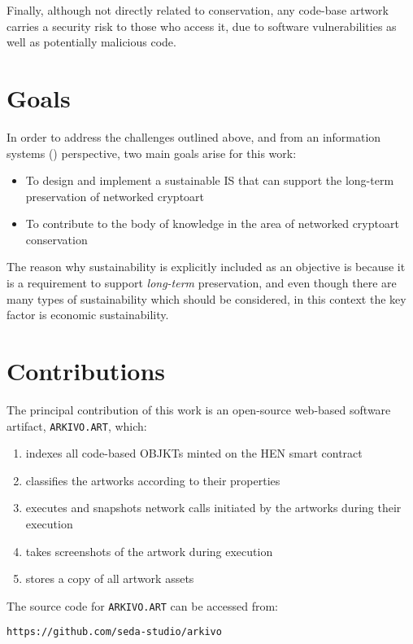 Finally, although not directly related to conservation, any code-base artwork carries a security risk to those who access it, due to software vulnerabilities as well as potentially malicious code.

\section{Goals}

In order to address the challenges outlined above, and from an information systems () perspective, two main goals arise for this work:

\begin{itemize}
	\item To design and implement a sustainable IS that can support the long-term preservation of networked cryptoart
	\item To contribute to the body of knowledge in the area of networked cryptoart conservation
\end{itemize}

The reason why sustainability is explicitly included as an objective is because it is a requirement to support \emph{long-term} preservation, and even though there are many types of sustainability which should be considered, in this context the key factor is economic sustainability.

\section{Contributions}

The principal contribution of this work is an open-source web-based software artifact, \texttt{ARKIVO.ART}, which:

\begin{enumerate}
	\item indexes all code-based OBJKTs minted on the HEN smart contract
	\item classifies the artworks according to their properties
	\item executes and snapshots network calls initiated by the artworks during their execution
	\item takes screenshots of the artwork during execution
	\item stores a copy of all artwork assets
\end{enumerate}

The source code for \texttt{ARKIVO.ART} can be accessed from:

\texttt{https://github.com/seda-studio/arkivo}

